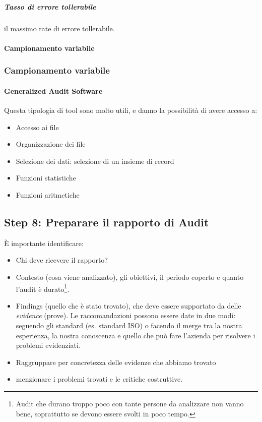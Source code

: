 \subparagraph*{Tasso di errore tollerabile} il massimo rate di errore tollerabile.

\paragraph*{Campionamento variabile}


\subsubsection{Campionamento variabile}




\paragraph{Generalized Audit Software}

Questa tipologia di tool sono molto utili, e danno la possibilità di avere accesso a:
\begin{itemize}
\item Accesso ai file
\item Organizzazione dei file
\item Selezione dei dati: selezione di un insieme di record
\item Funzioni statistiche
\item Funzioni aritmetiche
\end{itemize}

\subsection{Step 8: Preparare il rapporto di Audit}

È importante identificare:
\begin{itemize}
\item Chi deve ricevere il rapporto?
\item Contesto (cosa viene analizzato), gli obiettivi, il periodo coperto e quanto l'audit è durato\footnote{Audit che durano troppo poco con tante persone da analizzare non vanno bene, soprattutto se devono essere svolti in poco tempo.}.
\item Findings (quello che è stato trovato), che deve essere supportato da delle \emph{evidence} (prove). Le raccomandazioni possono essere date in due modi: seguendo gli standard (es. standard ISO) o facendo il merge tra la nostra esperienza, la nostra conoscenza e quello che può fare l'azienda per risolvere i problemi evidenziati.
\item Raggruppare per concretezza delle evidenze che abbiamo trovato
\item menzionare i problemi trovati e le critiche costruttive.
\end{itemize}

